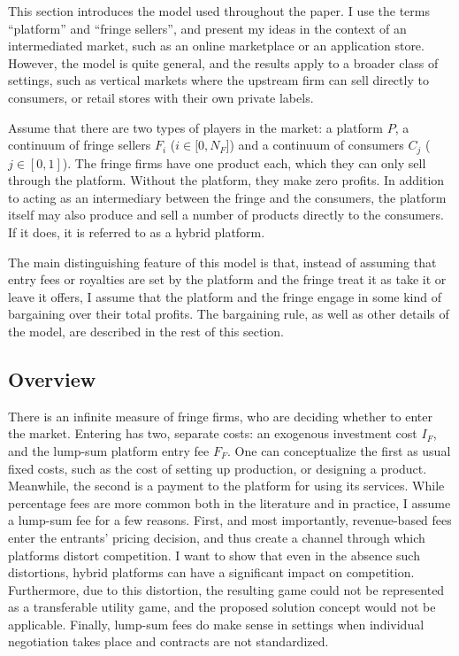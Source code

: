 \documentclass[a4paper]{article}
\begin{document}
This section introduces the model used throughout the paper.
I use the terms ``platform'' and ``fringe sellers'', and present my ideas in the context of an intermediated market, such as an online marketplace or an application store.
However, the model is quite general, and the results apply to a broader class of settings, such as vertical markets where the upstream firm can sell directly to consumers, or retail stores with their own private labels.

Assume that there are two types of players in the market: a platform $P$, a continuum of fringe sellers $F_i$ ($i \in [0, N_F$]) and a continuum of consumers $C_j$ ($j \in [0, 1]$).
The fringe firms have one product each, which they can only sell through the platform.
Without the platform, they make zero profits.
In addition to acting as an intermediary between the fringe and the consumers, the platform itself may also produce and sell a number of products directly to the consumers.
If it does, it is referred to as a hybrid platform.

The main distinguishing feature of this model is that, instead of assuming that entry fees or royalties are set by the platform and the fringe treat it as take it or leave it offers, I assume that the platform and the fringe engage in some kind of bargaining over their total profits.
The bargaining rule, as well as other details of the model, are described in the rest of this section.


\subsection{Overview}

There is an infinite measure of fringe firms, who are deciding whether to enter the market.
Entering has two, separate costs: an exogenous investment cost $I_F$, and the lump-sum platform entry fee $F_F$.
One can conceptualize the first as usual fixed costs, such as the cost of setting up production, or designing a product.
Meanwhile, the second is a payment to the platform for using its services.
While percentage fees are more common both in the literature and in practice, I assume a lump-sum fee for a few reasons.
First, and most importantly, revenue-based fees enter the entrants' pricing decision, and thus create a channel through which platforms distort competition.
I want to show that even in the absence such distortions, hybrid platforms can have a significant impact on competition.
Furthermore, due to this distortion, the resulting game could not be represented as a transferable utility game, and the proposed solution concept would not be applicable.
Finally, lump-sum fees do make sense in settings when individual negotiation takes place and contracts are not standardized.
\end{document}
